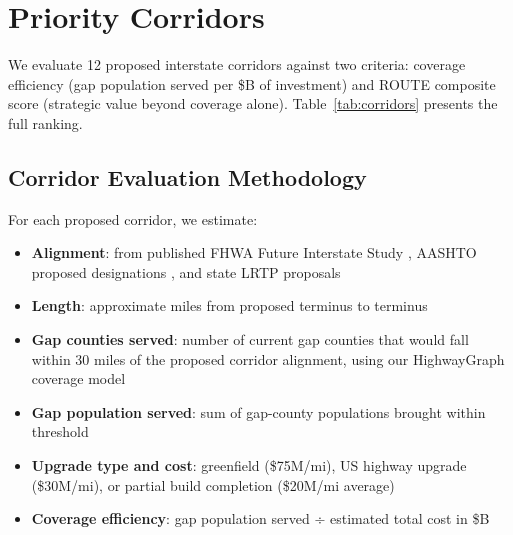 \section{Priority Corridors}
\label{sec:corridors}

We evaluate 12 proposed interstate corridors against two criteria: coverage efficiency (gap population served per \$B of investment) and ROUTE composite score (strategic value beyond coverage alone). Table~\ref{tab:corridors} presents the full ranking.

\subsection{Corridor Evaluation Methodology}

For each proposed corridor, we estimate:

\begin{itemize}
\item \textbf{Alignment}: from published FHWA Future Interstate Study \citep{FHWA_FIS2000}, AASHTO proposed designations \citep{AASHTO2023}, and state LRTP proposals
\item \textbf{Length}: approximate miles from proposed terminus to terminus
\item \textbf{Gap counties served}: number of current gap counties that would fall within 30 miles of the proposed corridor alignment, using our HighwayGraph coverage model
\item \textbf{Gap population served}: sum of gap-county populations brought within threshold
\item \textbf{Upgrade type and cost}: greenfield (\$75M/mi), US highway upgrade (\$30M/mi), or partial build completion (\$20M/mi average)
\item \textbf{Coverage efficiency}: gap population served ÷ estimated total cost in \$B
\end{itemize}

